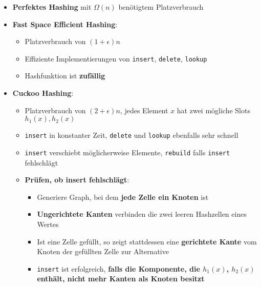\begin{itemize}
	\item \textbf{Perfektes Hashing} mit $\Omega(n)$ benötigtem Platzverbrauch
	\item \textbf{Fast Space Efficient Hashing}:
	\begin{itemize}
		\item Platzverbrauch von $(1 + \epsilon)n$
		\item Effiziente Implementierungen von \texttt{insert}, \texttt{delete}, \texttt{lookup}
		\item Hashfunktion ist \textbf{zufällig}
	\end{itemize}
	\item \textbf{Cuckoo Hashing}:
	\begin{itemize}
		\item Platzverbrauch von $(2 + \epsilon)n$, jedes Element $x$ hat zwei mögliche Slots $h_1(x), h_2(x)$
		\item \texttt{insert} in konstanter Zeit, \texttt{delete} und \texttt{lookup} ebenfalls sehr schnell
		\item \texttt{insert} verschiebt möglicherweise Elemente, \texttt{rebuild} falls \texttt{insert} fehlschlägt
		\item \textbf{Prüfen, ob insert fehlschlägt}:
		\begin{itemize}
			\item Generiere Graph, bei dem \textbf{jede Zelle ein Knoten} ist
			\item \textbf{Ungerichtete Kanten} verbinden die zwei leeren Hashzellen eines Wertes
			\item Ist eine Zelle gefüllt, so zeigt stattdessen eine \textbf{gerichtete Kante} vom Knoten der gefüllten Zelle zur Alternative
			\item \texttt{insert} ist erfolgreich, \textbf{falls die Komponente, die $h_1(x)$, $h_2(x)$ enthält, nicht mehr Kanten als Knoten besitzt}
		\end{itemize}
	\end{itemize}
\end{itemize}
